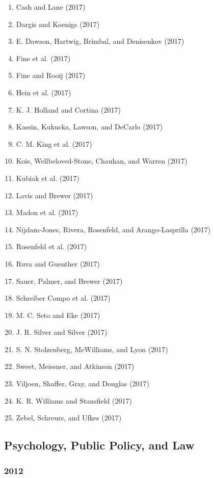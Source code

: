 \documentclass[english,man]{apa6}
\providecommand{\tightlist}{%
  \setlength{\itemsep}{0pt}\setlength{\parskip}{0pt}}
\theoremstyle{definition}
\theoremstyle{definition}
\theoremstyle{definition}
\theoremstyle{remark}
\begin{document}
\begin{enumerate}
\def\labelenumi{\arabic{enumi})}
\tightlist
\item
  Cash and Lane (2017)
\item
  Dargis and Koenigs (2017)
\item
  E. Dawson, Hartwig, Brimbal, and Denisenkov (2017)
\item
  Fine et al. (2017)
\item
  Fine and Rooij (2017)
\item
  Hein et al. (2017)
\item
  K. J. Holland and Cortina (2017)
\item
  Kassin, Kukucka, Lawson, and DeCarlo (2017)
\item
  C. M. King et al. (2017)
\item
  Kois, Wellbeloved-Stone, Chauhan, and Warren (2017)
\item
  Kubiak et al. (2017)
\item
  Lavis and Brewer (2017)
\item
  Madon et al. (2017)
\item
  Nijdam-Jones, Rivera, Rosenfeld, and Arango-Lasprilla (2017)
\item
  Rosenfeld et al. (2017)
\item
  Ruva and Guenther (2017)
\item
  Sauer, Palmer, and Brewer (2017)
\item
  Schreiber Compo et al. (2017)
\item
  M. C. Seto and Eke (2017)
\item
  J. R. Silver and Silver (2017)
\item
  S. N. Stolzenberg, McWilliams, and Lyon (2017)
\item
  Sweet, Meissner, and Atkinson (2017)
\item
  Viljoen, Shaffer, Gray, and Douglas (2017)
\item
  K. R. Williams and Stansfield (2017)
\item
  Zebel, Schreurs, and Ufkes (2017)
\end{enumerate}

\subsection{Psychology, Public Policy, and
Law}\label{psychology-public-policy-and-law}

\subsubsection{2012}\label{section-26}
\end{document}
